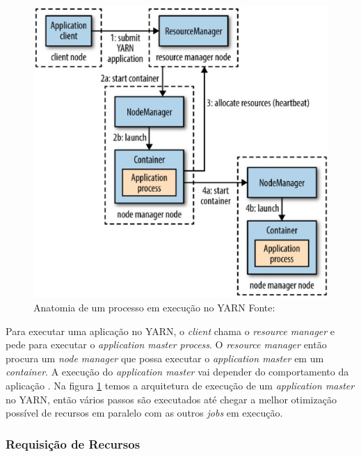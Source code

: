            \begin{figure}[ht!]
                        \centering
                        \includegraphics[keepaspectratio=true,scale=0.5]
                            {figuras/figura7.eps}
                        \caption[Anatomia de um processo em execução no YARN]{Anatomia de um processo em execução no YARN
                        \protect \linebreak Fonte: }
                        \label{figura7}
            \end{figure}

            Para executar uma aplicação no YARN, o \textit{client} chama o \textit{resource manager} e pede para executar
            o \textit{application master process}. O \textit{resource manager} então procura um \textit{node manager} que
            possa executar o \textit{application master} em um \textit{container}. A execução do \textit{application master}
            vai depender do comportamento da aplicação \cite{vavilapalli2013}. Na figura \ref{figura7} temos a arquitetura de
            execução de um \textit{application master} no YARN, então vários passos são executados até chegar a melhor
            otimização possível de recursos em paralelo com as outros \textit{jobs} em execução.

            \subsubsection{Requisição de Recursos}

